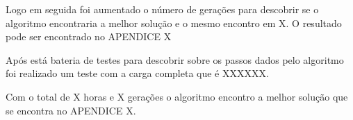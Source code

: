 \documentclass{abntpuc}
\begin{document}
Logo em seguida foi aumentado o número de gerações para descobrir se o algoritmo encontraria a melhor solução e o mesmo encontro em X. O resultado pode ser encontrado no APENDICE X


Após está bateria de testes para descobrir sobre os passos dados pelo algoritmo foi realizado um teste com a carga completa que é XXXXXX.

Com o total de X horas e X gerações o algoritmo encontro a melhor solução que se encontra no APENDICE X.


%
\end{document}
